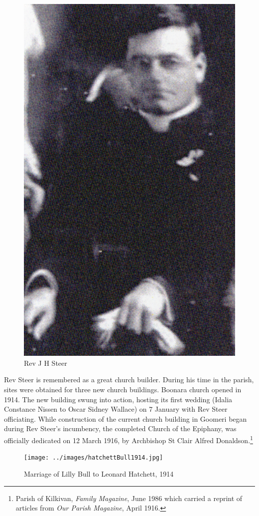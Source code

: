 \begin{figure}
\begin{center}
\includegraphics[width=.6\linewidth,center]{../images/JHSteer.jpg}
\caption{Rev J H Steer}
\end{center}
\end{figure}




Rev Steer is remembered as a great church builder. During his time in the parish, sites were obtained for three new church buildings. Boonara church opened in 1914. The new building swung into action, hosting its first wedding (Idalia Constance Nissen to Oscar Sidney Wallace) on 7 January with Rev Steer officiating. While construction of the current church building in Goomeri began during Rev Steer's incumbency, the completed Church of the Epiphany, was officially dedicated on 12 March 1916, by Archbishop St Clair Alfred Donaldson.\footnote{Parish of Kilkivan, \emph{Family Magazine}, June 1986 which carried a reprint of articles from \emph{Our Parish Magazine}, April 1916.}








\begin{figure}[!htb]
\begin{center}
\texttt{[image: ../images/hatchettBull1914.jpg]}
\caption{Marriage of Lilly Bull to Leonard Hatchett, 1914}
\end{center}
\end{figure}




